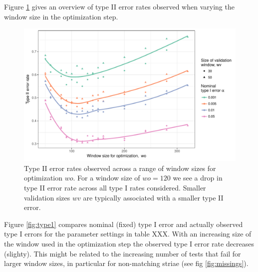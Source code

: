 \documentclass[12pt]{article}
\begin{document}
Figure \ref{fig:type2} gives an overview of type II error rates observed
when varying the window size in the optimization step.

\begin{figure}

{\centering \includegraphics[width=\textwidth]{figures/type2-1} 

}

\caption{Type II error rates observed across a range of window sizes for optimization $wo$. For a window size of $wo = 120$ we see a drop in type II error rate across all type I rates considered. Smaller validation sizes $wv$ are typically associated with a smaller type II error.}\label{fig:type2}
\end{figure}

Figure \ref{fig:type1} compares nominal (fixed) type I error and
actually observed type I errors for the parameter settings in table XXX.
With an increasing size of the window used in the optimization step the
observed type I error rate decreases (slighty). This might be related to
the increasing number of tests that fail for larger window sizes, in
particular for non-matching striae (see fig \ref{fig:missings}).
\end{document}

